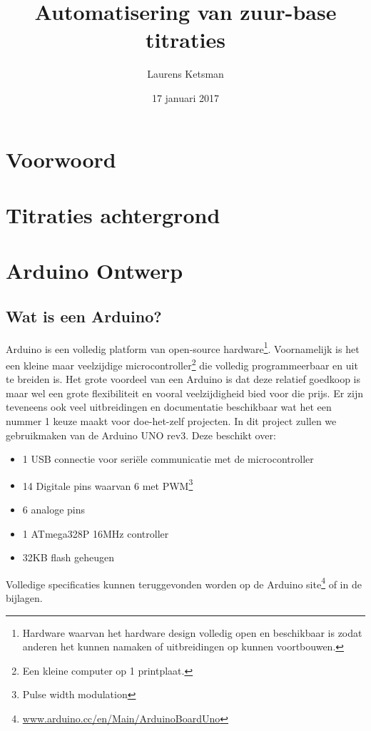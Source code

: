 \documentclass[10pt,twoside]{report}
\author{Laurens Ketsman}
\title{Automatisering van zuur-base titraties}
\date{17 januari 2017}
\newcommand\blankpage{%
    \null
    \thispagestyle{empty}%
    \addtocounter{page}{-1}%
    \newpage}
\newcommand{\pbr}{\hfill\break\hfill\break}
\newcommand{\lbr}{\hfill\break}
\begin{document}
\clearpage
\maketitle
\thispagestyle{empty}

\blankpage

\tableofcontents
\thispagestyle{empty}

\newpage
\chapter*{Voorwoord}
\thispagestyle{empty}
\newpage

\pagestyle{fancy}
\fancyhf{}
\fancyhead[RO]{\leftmark\ \rule[-0.25em]{0.14em}{1.3em}\ \thepage}
\fancyhead[LE]{\thepage\ \rule[-0.25em]{0.14em}{1.3em}\ \rightmark}

\chapter{Titraties achtergrond}

\chapter{Arduino Ontwerp}
\section{Wat is een Arduino?}
Arduino is een volledig platform van open-source hardware\footnote{Hardware waarvan het hardware design volledig open en beschikbaar is zodat anderen het kunnen namaken of uitbreidingen op kunnen voortbouwen.}. Voornamelijk is het een kleine maar veelzijdige microcontroller\footnote{Een kleine computer op 1 printplaat.} die volledig programmeerbaar en uit te breiden is.
\pbr
Het grote voordeel van een Arduino is dat deze relatief goedkoop is maar wel een grote flexibiliteit en vooral veelzijdigheid bied voor die prijs. Er zijn teveneens ook veel uitbreidingen en documentatie beschikbaar wat het een nummer 1 keuze maakt voor doe-het-zelf projecten.
\pbr
In dit project zullen we gebruikmaken van de Arduino UNO rev3.\lbr
Deze beschikt over:
\begin{itemize}
    \item 1 USB connectie voor seriële communicatie met de microcontroller
    \item 14 Digitale pins waarvan 6 met PWM\footnote{Pulse width modulation}
    \item 6 analoge pins
    \item 1 ATmega328P 16MHz controller
    \item 32KB flash geheugen
\end{itemize}
Volledige specificaties kunnen teruggevonden worden op de Arduino site\footnote{\url{www.arduino.cc/en/Main/ArduinoBoardUno}} of in de bijlagen.
\end{document}
